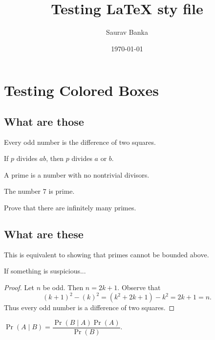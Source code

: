 \documentclass[11pt]{article}
\title{Testing LaTeX sty file}
\author{Saurav Banka}
\date{\today}
\begin{document}
\maketitle
\section{Testing Colored Boxes}
\subsection{What are those}

\begin{theorem}\label{thm:oddsquares}
Every odd number is the difference of two squares.
\end{theorem}

\begin{lemma}\label{lem:div}
If $p$ divides $ab$, then $p$ divides $a$ or $b$.
\end{lemma}

\begin{definition}\label{def:prime}
A prime is a number with no nontrivial divisors.
\end{definition}

\begin{example}\label{ex:prime7}
The number $7$ is prime.
\end{example}

\begin{exercise}\label{ex:infprimes}
Prove that there are infinitely many primes.
\end{exercise}

\subsection{What are these}
\begin{note}\label{note:equiv}
This is equivalent to showing that primes cannot be bounded above.
\end{note}


\begin{theorem}\label{thm:murphys}
If something is suspicious...
\begin{proof}
Let $n$ be odd. Then $n = 2k+1$.  
Observe that
\[
( k+1 )^2 - ( k )^2 = (k^2 + 2k + 1) - k^2 = 2k+1 = n.
\]
Thus every odd number is a difference of two squares.
\end{proof}
\end{theorem}


\begin{proposition}
$\Pr(A \mid B) = \dfrac{\Pr(B \mid A) \Pr(A)}{\Pr(B)}$.
\end{proposition}
\end{document}
